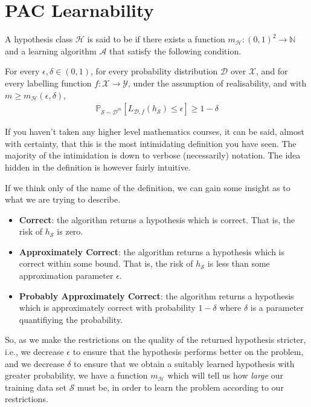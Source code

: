 \section{PAC Learnability \challenging}
\begin{definition}
	A hypothesis class $ \mathcal{H} $ is said to be  if there exists a function $ m_{\mathcal{H}}: ( 0,1 )^{2}\to \mathbb{N} $ and a learning algorithm $ \mathcal{A} $ that satisfy the following condition.

	For every $ \epsilon, \delta \in ( 0,1 ) $, for every probability distribution $ \mathcal{D} $ over $ \mathcal{X} $, and for every labelling function $ f: \mathcal{X}\to \mathcal{Y} $, under the assumption of realisability, and with $ m \geq m_{\mathcal{H}}( \epsilon, \delta ) $,
	\begin{align*}
		\mathbb{P}_{\mathcal{S}\sim \mathcal{D}^{m}}\left[ L_{\mathcal{D}, f}( h_{\mathcal{S}} )\leq \epsilon \right] \geq 1-\delta
	\end{align*}
\end{definition}

\begin{remark}
	If you haven't taken any higher level mathematics courses, it can be said, almost with certainty, that this is the most intimidating definition you have seen. The majority of the intimidation is down to verbose (necessarily) notation. The idea hidden in the definition is however fairly intuitive.

	If we think only of the name of the definition, we can gain some insight as to what we are trying to describe.
	\begin{itemize}
		\item \textbf{Correct}: the algorithm returns a hypothesis which is correct. That is, the risk of $ h_{\mathcal{S}} $ is zero.
		\item \textbf{Approximately Correct}: the algorithm returns a hypothesis which is correct within some bound. That is, the risk of $ h_{\mathcal{S}} $ is less than some approximation parameter $ \epsilon $.
		\item \textbf{Probably Approximately Correct}: the algorithm returns a hypothesis which is approximately correct with probability $ 1-\delta $ where $ \delta $ is a parameter quantifiying the probability.
	\end{itemize}

	So, as we make the restrictions on the quality of the returned hypothesis stricter, i.e., we decrease $ \epsilon $ to ensure that the hypothesis performs better on the problem, and we decrease $ \delta $ to ensure that we obtain a suitably learned hypothesis with greater probability, we have a function $ m_{\mathcal{H}} $ which will tell us how \textit{large} our training data set $ \mathcal{S} $ must be, in order to learn the problem according to our restrictions.
\end{remark}

